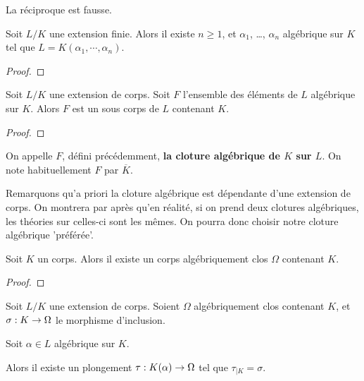 \begin{remarque}
	La réciproque est fausse.
\end{remarque}

\begin{proposition}
	Soit $L/K$ une extension finie. Alors il existe $n \geq 1$, et $\alpha_{1}$,
	\ldots, $\alpha_{n}$ algébrique sur $K$ tel que $L = K(\alpha_{1}, \cdots,
	\alpha_{n})$.
\end{proposition}

\ifdefined\outputproof
\begin{proof}

\end{proof}
\fi

\begin{proposition}
	Soit $L/K$ une extension de corps.
	Soit $F$ l'ensemble des éléments de $L$ algébrique sur $K$.
	Alors $F$ est un sous corps de $L$ contenant $K$.
\end{proposition}

\ifdefined\outputproof
\begin{proof}

\end{proof}
\fi

\begin{definition}
	On appelle $F$, défini précédemment, \textbf{la cloture algébrique de $K$
	sur $L$}.
	On note habituellement $F$ par $\overline{K}$.
\end{definition}

Remarquons qu'a priori la cloture algébrique est dépendante d'une extension de
corps. On montrera par après qu'en réalité, si on prend deux clotures
algébriques, les théories sur celles-ci sont les mêmes. On pourra donc choisir
notre cloture algébrique 'préférée'.

\begin{theorem}
	Soit $K$ un corps. Alors il existe un corps algébriquement clos $\Omega$
	contenant $K$.
\end{theorem}

\ifdefined\outputproof
\begin{proof}

\end{proof}
\fi

\begin{lemma}
	Soit $L/K$ une extension de corps. Soient $\Omega$ algébriquement clos
	contenant $K$, et
	$\sigma : K \rightarrow \Omega$ le morphisme d'inclusion.

	Soit $\alpha \in L$ algébrique sur $K$.

	Alors il existe un plongement $\tau : K(\alpha) \rightarrow \Omega$ tel que
	$\tau_{|K} = \sigma$.
\end{lemma}

